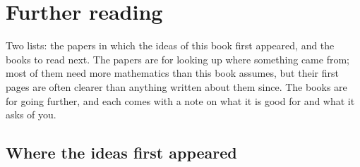 
\chapter{Further reading}
\label{app:reading}

\noindent
Two lists: the papers in which the ideas of this book first appeared, and
the books to read next. The papers are for looking up where something came
from; most of them need more mathematics than this book assumes, but their
first pages are often clearer than anything written about them since. The
books are for going further, and each comes with a note on what it is good
for and what it asks of you.

\section{Where the ideas first appeared}
\label{sec:appd-papers}

